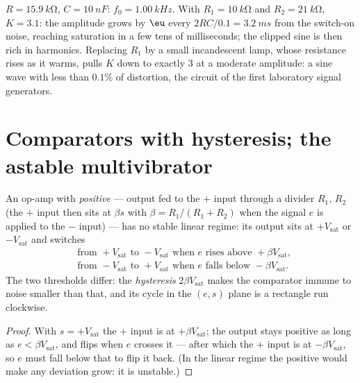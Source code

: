 \begin{example}\label{ex:b2:feedback-oscillators:wiennumbers}
$R = \qty{15.9}{k\ohm}$, $C = \qty{10}{nF}$: $f_0 = \qty{1.00}{kHz}$. With $R_1 =
\qty{10}{k\ohm}$ and $R_2 = \qty{21}{k\ohm}$, $K = 3.1$: the amplitude grows by
$\eu$ every $2RC/0.1 = \qty{3.2}{ms}$ from the switch-on noise, reaching
saturation in a few tens of milliseconds; the clipped sine is then
rich in harmonics. Replacing $R_1$ by a small incandescent lamp, whose
resistance rises as it warms, pulls $K$ down to exactly $3$ at a
moderate amplitude: a sine wave with less than $0.1\%$ of distortion,
the circuit of the first laboratory signal generators.
\end{example}

\section{Comparators with hysteresis; the astable multivibrator}

\begin{proposition}\label{prop:b2:feedback-oscillators:schmitt}
An op-amp with \emph{positive}  --- output fed to the $+$ input
through a divider $R_1$, $R_2$ (the $+$ input then sits at $\beta s$ with
$\beta = R_1/(R_1 + R_2)$ when the signal $e$ is applied to the $-$ input)
--- has no stable linear regime: its output sits at $+V_{\text{sat}}$ or
$-V_{\text{sat}}$ and switches
\begin{align*}
&\text{from } +V_{\text{sat}} \text{ to } -V_{\text{sat}} \text{ when } e \text{ rises above } +\beta V_{\text{sat}} ,\\
&\text{from } -V_{\text{sat}} \text{ to } +V_{\text{sat}} \text{ when } e \text{ falls below } -\beta V_{\text{sat}} .
\end{align*}
The two thresholds differ: the \emph{hysteresis} $2\beta V_{\text{sat}}$ makes
the comparator immune to noise smaller than that, and its cycle in
the $(e, s)$ plane is a rectangle run clockwise.
\end{proposition}

\begin{proof}
With $s = +V_{\text{sat}}$ the $+$ input is at $+\beta V_{\text{sat}}$; the output
stays positive as long as $e < \beta V_{\text{sat}}$, and flips when $e$ crosses
it --- after which the $+$ input is at $-\beta V_{\text{sat}}$, so $e$ must
fall below that to flip it back. (In the linear regime the positive
 would make any deviation grow: it is unstable.)
\end{proof}

